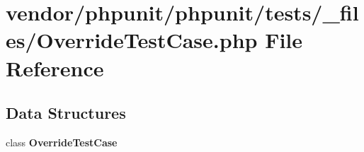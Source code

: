 \section{vendor/phpunit/phpunit/tests/\+\_\+files/\+Override\+Test\+Case.php File Reference}
\label{_override_test_case_8php}
\subsection*{Data Structures}
\begin{DoxyCompactItemize}
\item 
class {\bf Override\+Test\+Case}
\end{DoxyCompactItemize}
